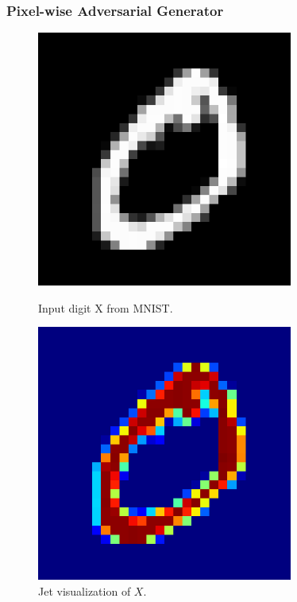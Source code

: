 \documentclass{beamer}
\begin{document}
\begin{frame}
	\frametitle{Pixel-wise Adversarial Generator}
	
	\begin{figure}[H]
		\begin{minipage}[t]{0.3\linewidth}
			\centering
			\includegraphics[width=0.75\textwidth]{img/advpixel/example.png}
			\caption{\small Input digit X from MNIST.}
		\end{minipage}        
		\hspace{.1cm}
		\begin{minipage}[t]{0.3\linewidth}
			\centering
			\includegraphics[width=0.75\textwidth]{img/advpixel/examplejet.png}
			\caption{\small Jet visualization of $X$.}

\end{minipage}
\end{figure}
\end{frame}
\end{document}

